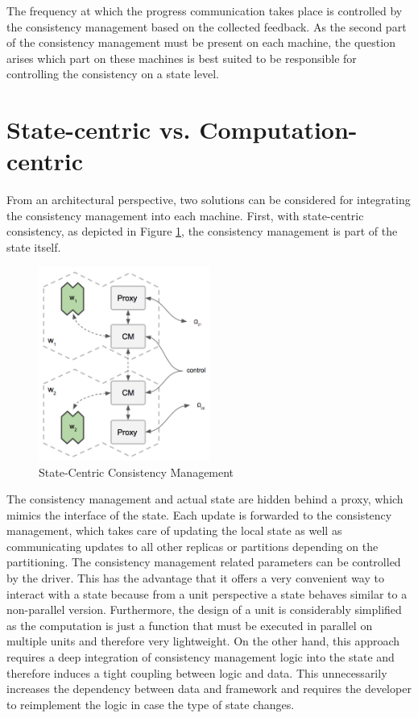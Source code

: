 The frequency at which the progress communication takes place is controlled by the consistency management based on the collected feedback.
As the second part of the consistency management must be present on each machine, the question arises which part on these machines is best suited to be responsible for controlling the consistency on a state level.

\section{State-centric vs. Computation-centric}
From an architectural perspective, two solutions can be considered for integrating the consistency management into each machine.
First, with state-centric consistency, as depicted in Figure \ref{fig:state_centric_consistency}, the consistency management is part of the state itself.
\begin{figure}[ht]
\centering
\includegraphics[width=0.5\textwidth]{img/state_centric_consist.png}
\caption{State-Centric Consistency Management}
\label{fig:state_centric_consistency}
\end{figure}
The consistency management and actual state are hidden behind a proxy, which mimics the interface of the state.
Each update is forwarded to the consistency management, which takes care of updating the local state as well as communicating updates to all other replicas or partitions depending on the partitioning.
The consistency management related parameters can be controlled by the driver.
This has the advantage that it offers a very convenient way to interact with a state because from a unit perspective a state behaves similar to a non-parallel version.
Furthermore, the design of a unit is considerably simplified as the computation is just a function that must be executed in parallel on multiple units and therefore very lightweight.
On the other hand, this approach requires a deep integration of consistency management logic into the state and therefore induces a tight coupling between logic and data.
This unnecessarily increases the dependency between data and framework and requires the developer to reimplement the logic in case the type of state changes.

